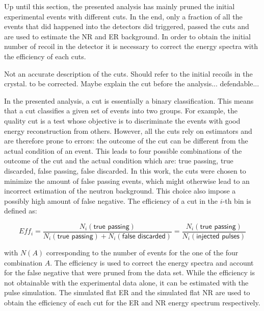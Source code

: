Up until this section, the presented analysis has mainly pruned the initial experimental events with different cuts. In the end, only a fraction of all the events that did happened into the detectors did triggered, passed the cuts and are used to estimate the NR and ER background. In order to obtain the initial number of recoil in the detector it is necessary to correct the energy spectra with the efficiency of each cuts.

{\color{red} Not an accurate description of the cuts. Should refer to the initial recoils in the crystal. to be corrected. Maybe explain the cut before the analysis... defendable...}

In the presented analysis, a cut is essentially a binary classification. This means that a cut classifies a given set of events into two groups. For example, the quality cut is a test whose objective is to discriminate the events with good energy reconstruction from others. However, all the cuts rely on estimators and are therefore prone to errors: the outcome of the cut can be different from the actual condition of an event. This leads to four possible combinations of the outcome of the cut and the actual condition which are: true passing, true discarded, false passing, false discarded.
In this work, the cuts were chosen to minimize the amount of false passing events, which might otherwise lead to an incorrect estimation of the neutron background. This choice also impose a possibly high amount of false negative. The efficiency of a cut in the $i$-th bin is defined as:

\begin{equation}
Eff_{i} 
= \frac{ N_i\left( \textsf{true passing} \right) }{ N_i \left( \textsf{true passing} \right) + N_i \left( \textsf{false discarded} \right) }
= \frac{ N_i\left( \textsf{true passing} \right) }{ N_i (\textsf{injected pulses})}
\end{equation}

with $N(A)$ corresponding to the number of events for the one of the four combination $A$.
The efficiency is used to correct the energy spectra and account for the false negative that were pruned from the data set. 
While the efficiency is not obtainable with the experimental data alone, it can be estimated with the pulse simulation. The simulated flat ER and the simulated flat NR are used to obtain the efficiency of each cut for the ER and NR energy spectrum respectively.

